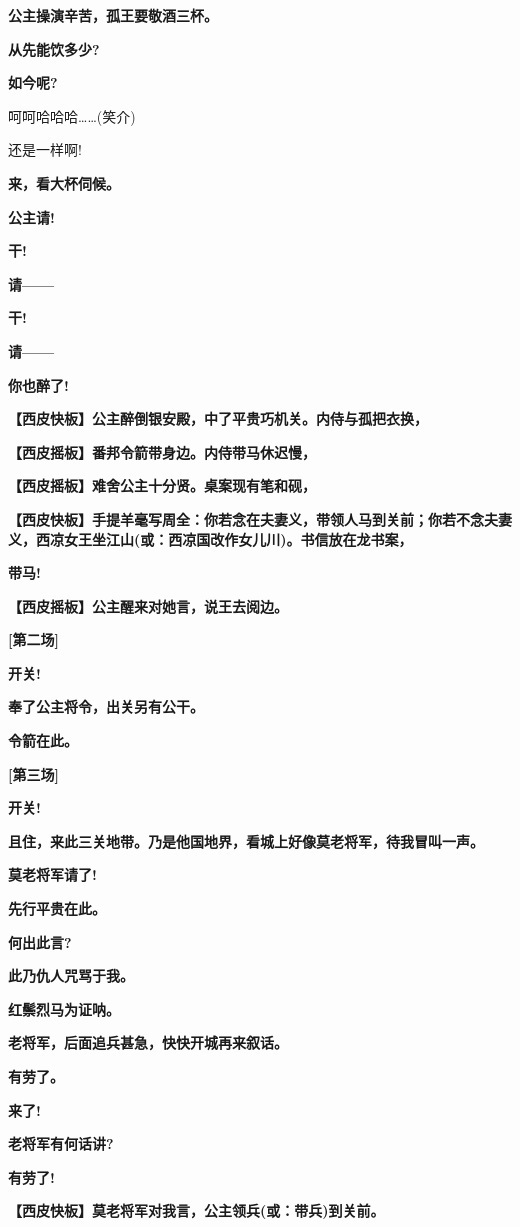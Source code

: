 \textbf{公主操演辛苦，孤王要敬酒三杯。}

\textbf{从先能饮多少?}

\textbf{如今呢?}

呵呵哈哈哈\ldots{}\ldots{}(笑介)

还是一样啊!

\textbf{来，看大杯伺候。}

\textbf{公主请!}

\textbf{干!}

\textbf{请------}

\textbf{干!}

\textbf{请------}

\textbf{你也醉了!}

\textbf{【西皮快板】公主醉倒银安殿，中了平贵巧机关。内侍与孤把衣换，}

\textbf{【西皮摇板】番邦令箭带身边。内侍带马休迟慢，}

\textbf{【西皮摇板】难舍公主十分贤。桌案现有笔和砚，}

\textbf{【西皮快板】手提羊毫写周全：你若念在夫妻义，带领人马到关前；你若不念夫妻义，西凉女王坐江山(或：西凉国改作女儿川)。书信放在龙书案，}

\textbf{带马!}

\textbf{【西皮摇板】公主醒来对她言，说王去阅边。}

\textbf{{[}第二场{]}}

\textbf{开关!}

\textbf{奉了公主将令，出关另有公干。}

\textbf{令箭在此。}

\textbf{{[}第三场{]}}

\textbf{开关!}

\textbf{且住，来此三关地带。乃是他国地界，看城上好像莫老将军，待我冒叫一声。}

\textbf{莫老将军请了!}

\textbf{先行平贵在此。}

\textbf{何出此言?}

\textbf{此乃仇人咒骂于我。}

\textbf{红鬃烈马为证呐。}

\textbf{老将军，后面追兵甚急，快快开城再来叙话。}

\textbf{有劳了。}

\textbf{来了!}

\textbf{老将军有何话讲?}

\textbf{有劳了!}

\textbf{【西皮快板】莫老将军对我言，公主领兵(或：带兵)到关前。}

